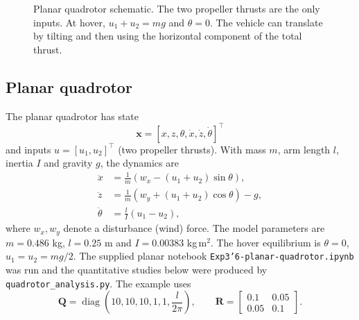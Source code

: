 \documentclass[11pt]{article}
\newcommand{\x}{\mathbf{x}}
\newcommand{\Q}{\mathbf{Q}}
\newcommand{\R}{\mathbf{R}}
\begin{document}
\begin{figure}[htbp]
\centering
{}
\caption{Planar quadrotor schematic.  The two propeller thrusts are the only
inputs.  At hover, $u_1+u_2=mg$ and $\theta=0$.  The vehicle can translate by
tilting and then using the horizontal component of the total thrust.}
\label{fig:planar_quad}
\end{figure}

\subsection{Planar quadrotor}

The planar quadrotor has state
\begin{equation}
\x=[x,z,\theta,\dot x,\dot z,\dot\theta]^\top
\end{equation}
and inputs $u=[u_1,u_2]^\top$ (two propeller thrusts).  With mass $m$, arm
length $l$, inertia $I$ and gravity $g$, the dynamics are
\begin{align}
\ddot x &= \frac{1}{m}\left(w_x-(u_1+u_2)\sin\theta\right),\\
\ddot z &= \frac{1}{m}\left(w_y+(u_1+u_2)\cos\theta\right)-g,\\
\ddot\theta &= \frac{l}{I}(u_1-u_2),
\end{align}
where $w_x,w_y$ denote a disturbance (wind) force.  The model parameters are
$m=0.486$ kg, $l=0.25$ m and $I=0.00383$ kg\,m$^2$.  The hover equilibrium is
$\theta=0$, $u_1=u_2=mg/2$.  The supplied planar notebook \texttt{Exp3'6-planar-quadrotor.ipynb}
was run and the quantitative studies below were produced by
\texttt{quadrotor\_analysis.py}.  The example uses
\begin{equation}
\Q=\operatorname{diag}\!\left(10,10,10,1,1,\frac{l}{2\pi}\right),
\qquad
\R=\begin{bmatrix}0.1&0.05\\0.05&0.1\end{bmatrix}.
\end{equation}
\end{document}

